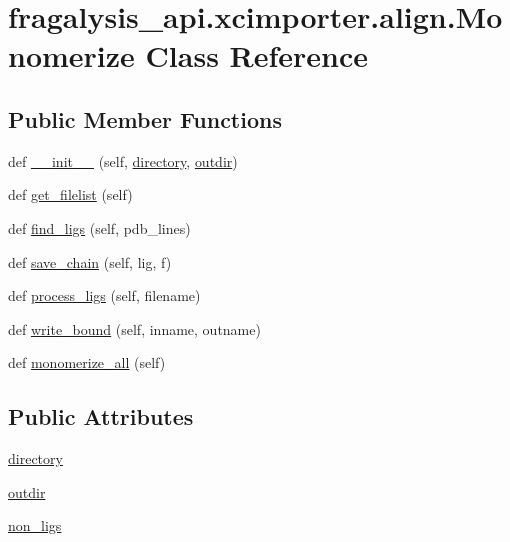 \hypertarget{classfragalysis__api_1_1xcimporter_1_1align_1_1_monomerize}{}\section{fragalysis\+\_\+api.\+xcimporter.\+align.\+Monomerize Class Reference}
\label{classfragalysis__api_1_1xcimporter_1_1align_1_1_monomerize}
\subsection*{Public Member Functions}
\begin{DoxyCompactItemize}
\item 
def \hyperlink{classfragalysis__api_1_1xcimporter_1_1align_1_1_monomerize_ab3b407ab1e80bd20413390da2e92bc45}{\+\_\+\+\_\+init\+\_\+\+\_\+} (self, \hyperlink{classfragalysis__api_1_1xcimporter_1_1align_1_1_monomerize_a20636604f47438298d2420ce35297281}{directory}, \hyperlink{classfragalysis__api_1_1xcimporter_1_1align_1_1_monomerize_a7d47cce7a11f51abbfc8b246b42f5181}{outdir})
\item 
def \hyperlink{classfragalysis__api_1_1xcimporter_1_1align_1_1_monomerize_ae400c1aa47fa3a5fe32a3ade3f601582}{get\+\_\+filelist} (self)
\item 
def \hyperlink{classfragalysis__api_1_1xcimporter_1_1align_1_1_monomerize_a95bebe718abd76f9546c67db4a1848b3}{find\+\_\+ligs} (self, pdb\+\_\+lines)
\item 
def \hyperlink{classfragalysis__api_1_1xcimporter_1_1align_1_1_monomerize_a7dc86cd770a6c7532e96b0f45d91dc2b}{save\+\_\+chain} (self, lig, f)
\item 
def \hyperlink{classfragalysis__api_1_1xcimporter_1_1align_1_1_monomerize_a182c0cf1af3303f6c13d5160c6c0ff8e}{process\+\_\+ligs} (self, filename)
\item 
def \hyperlink{classfragalysis__api_1_1xcimporter_1_1align_1_1_monomerize_aa97d5e71f2d0309e12bc4beafa5151fc}{write\+\_\+bound} (self, inname, outname)
\item 
def \hyperlink{classfragalysis__api_1_1xcimporter_1_1align_1_1_monomerize_a2418993e78b9269ecc5d4222a142261c}{monomerize\+\_\+all} (self)
\end{DoxyCompactItemize}
\subsection*{Public Attributes}
\begin{DoxyCompactItemize}
\item 
\hyperlink{classfragalysis__api_1_1xcimporter_1_1align_1_1_monomerize_a20636604f47438298d2420ce35297281}{directory}
\item 
\hyperlink{classfragalysis__api_1_1xcimporter_1_1align_1_1_monomerize_a7d47cce7a11f51abbfc8b246b42f5181}{outdir}
\item 
\hyperlink{classfragalysis__api_1_1xcimporter_1_1align_1_1_monomerize_ad165d10ed4bed3d12660094bcd82ea62}{non\+\_\+ligs}
\end{DoxyCompactItemize}


